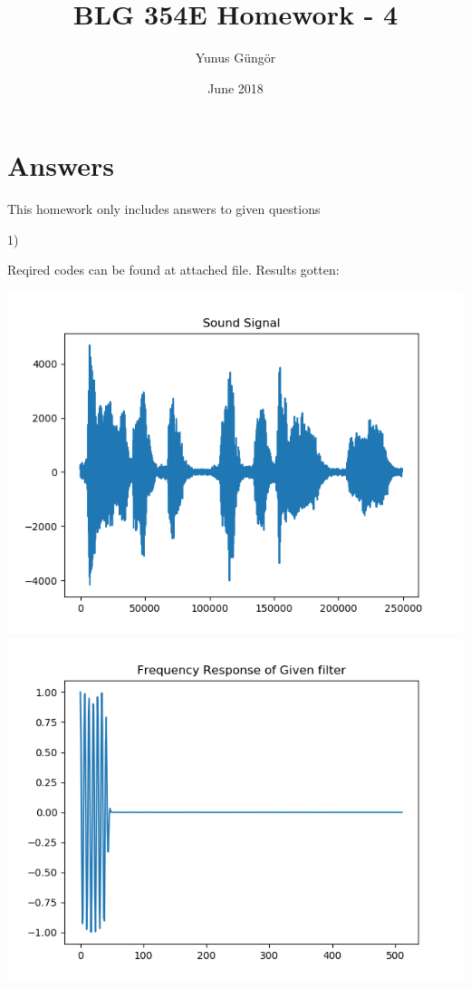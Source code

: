 \documentclass{article}
\title{BLG 354E Homework - 4}
\author{Yunus Güngör }
\date{June 2018}
\begin{document}
	
	\maketitle
	
	\section{Answers}
	
	This homework only includes answers to given questions
	
	1)\par
		Reqired codes can be found at attached file.
		Results gotten:\par
		
	\includegraphics[scale=0.4]{sound_org}
	\includegraphics[scale=0.4]{freq_response}
\end{document}
